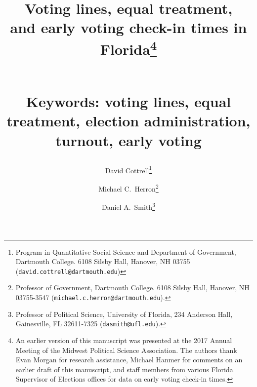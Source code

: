 \documentclass[12pt,titlepage]{article}
\providecommand{\keywords}[1]{\textbf{\normalsize{Keywords: }} \normalsize{#1}}
\begin{document}
\sloppy
\thispagestyle{empty}


\renewcommand{\topfraction}{.85}
\renewcommand{\bottomfraction}{.7}
\renewcommand{\textfraction}{.15}
\renewcommand{\floatpagefraction}{.66}
\renewcommand{\dbltopfraction}{.66}
\renewcommand{\dblfloatpagefraction}{.66}



\title{Voting lines, equal treatment,\\and early voting check-in times
  in Florida\thanks{An earlier version of this manuscript was
    presented at the 2017 Annual Meeting of the Midwest Political
    Science Association.  The authors thank Evan Morgan for research
    assistance, Michael Hanmer for comments on an earlier draft of
    this manuscript, and staff members from various Florida Supervisor
    of Elections offices for data on early voting check-in
    times.}\author{David Cottrell\thanks{Program in Quantitative
      Social Science and Department of Government, Dartmouth College.
      6108 Silsby Hall, Hanover, NH 03755
      (\texttt{david.cottrell@dartmouth.edu})} \and Michael C.\
    Herron\thanks{Professor of Government, Dartmouth College.  6108
      Silsby Hall, Hanover, NH 03755-3547
      (\texttt{michael.c.herron@dartmouth.edu}).} \and Daniel A.\
    Smith\thanks{Professor of Political Science, University of
      Florida, 234 Anderson Hall, Gainesville, FL 32611-7325
      (\texttt{dasmith@ufl.edu}).}}\vspace{1cm}\\\keywords{voting
    lines, equal treatment, election administration, turnout, early
    voting}}

\maketitle \doublespacing 



\end{document}
